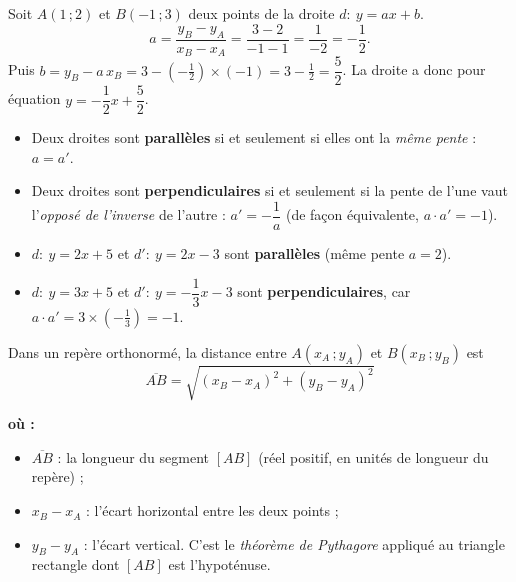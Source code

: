 \documentclass[11pt,a4paper]{article}
\newenvironment{ou}{%
  \par\smallskip\noindent\textbf{où :}\nopagebreak
  \begin{itemize}[leftmargin=1.8em,topsep=2pt,itemsep=1.5pt,parsep=0pt]}%
  {\end{itemize}}
\begin{document}
\begin{exemple}
Soit $A(1\,;2)$ et $B(-1\,;3)$ deux points de la droite $d:\ y=ax+b$.
\[
  a=\frac{y_B-y_A}{x_B-x_A}=\frac{3-2}{-1-1}=\frac{1}{-2}=-\frac12 .
\]
Puis $b=y_B-a\,x_B=3-\left(-\tfrac12\right)\times(-1)=3-\tfrac12=\dfrac52$.
La droite a donc pour équation $y=-\dfrac12 x+\dfrac52$.
\end{exemple}

\begin{theoreme}
\begin{itemize}[leftmargin=1.5em,topsep=2pt]
  \item Deux droites sont \textbf{parallèles} si et seulement si elles ont la \emph{même
        pente} : $a=a'$.
  \item Deux droites sont \textbf{perpendiculaires} si et seulement si la pente de l'une
        vaut l'\emph{opposé de l'inverse} de l'autre : $a'=-\dfrac{1}{a}$
        (de façon équivalente, $a\cdot a'=-1$).
\end{itemize}
\end{theoreme}

\begin{exemple}
\begin{itemize}[leftmargin=1.5em,topsep=2pt]
  \item $d:\ y=2x+5$ et $d':\ y=2x-3$ sont \textbf{parallèles} (même pente $a=2$).
  \item $d:\ y=3x+5$ et $d':\ y=-\dfrac13 x-3$ sont \textbf{perpendiculaires}, car
        $a\cdot a'=3\times\left(-\tfrac13\right)=-1$.
\end{itemize}
\end{exemple}

\begin{formule}
Dans un repère orthonormé, la distance entre $A(x_A\,;y_A)$ et $B(x_B\,;y_B)$ est
\[
  \boxed{\;\overline{AB}=\sqrt{(x_B-x_A)^2+(y_B-y_A)^2}\;}
\]
\begin{ou}
  \item $\overline{AB}$ : la longueur du segment $[AB]$ (réel positif, en unités de longueur du repère) ;
  \item $x_B-x_A$ : l'écart horizontal entre les deux points ;
  \item $y_B-y_A$ : l'écart vertical. C'est le \emph{théorème de Pythagore} appliqué au triangle rectangle dont $[AB]$ est l'hypoténuse.
\end{ou}
\end{formule}
\end{document}
